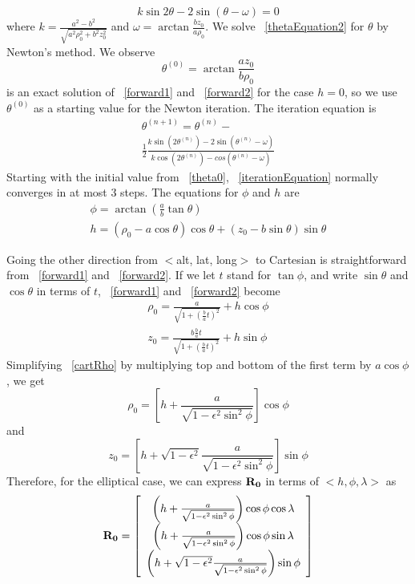 \documentclass[twoside,11pt,titlepage]{report}
\begin{document}
\begin{equation}
k\sin2\theta - 2\sin(\theta-\omega) = 0
\label{thetaEquation2}
\end{equation}
\noindent where $k = \frac{a^2-b^2}{\sqrt{a^2\rho_0^2+b^2z_0^2}}$ and $\omega = \arctan\frac{bz_0}{a\rho_0}$.
We solve ~\ref{thetaEquation2} for $\theta$ by Newton's method.  We observe \begin{equation}
\theta^{(0)} = \arctan\frac{az_0}{b\rho_0}
\label{theta0}
\end{equation}
\noindent is an exact solution of ~\ref{forward1} and ~\ref{forward2} for the case $h = 0$, so we use $\theta^{(0)}$ as a starting value for the Newton iteration.  The iteration equation is
\begin{eqnarray}
\theta^{(n+1)} = \theta^{(n)} - \nonumber \\
\frac{1}{2}\frac{k\sin(2\theta^{(n)}) - 2\sin(\theta^{(n)}-\omega)}
{k\cos(2\theta^{(n)}) - cos(\theta^{(n)}-\omega)}
\label{iterationEquation}
\end{eqnarray}
Starting with the initial value from ~\ref{theta0}, ~\ref{iterationEquation} normally converges in at most $3$ steps.  The equations for $\phi$ and $h$ are
\begin{eqnarray}
\phi = \arctan(\frac{a}{b}\tan\theta) \label{phiEquation} \\
h = (\rho_0-a\cos\theta)\cos\theta + (z_0-b\sin\theta)\sin\theta
\label{hEquation}
\end{eqnarray}

Going the other direction from $<$alt, lat, long$>$ to Cartesian is straightforward from ~\ref{forward1} and ~\ref{forward2}.  If we let $t$ stand for $\tan\phi$, and write $\sin\theta$ and $\cos\theta$ in terms of $t$, ~\ref{forward1} and ~\ref{forward2} become
\begin{eqnarray}
\rho_0 = \frac{a}{\sqrt{1+(\frac{b}{a}t)^2}} + h\cos\phi
\label{cartRho} \\
z_0 = \frac{b\frac{b}{a}t}{\sqrt{1+(\frac{b}{a}t)^2}} + h\sin\phi
\label{cartZ}
\end{eqnarray}
Simplifying ~\ref{cartRho} by multiplying top and bottom of the first term by $a\cos\phi$, we get
\begin{equation}
\rho_0 = \left[h + \frac{a}{\sqrt{1-\epsilon^2\sin^2\phi}}\right]\cos\phi
\label{cartRho1}
\end{equation}
and
\begin{equation}
z_0 = \left[h + \sqrt{1-\epsilon^2}\frac{a}{\sqrt{1-\epsilon^2\sin^2\phi}}\right]\sin\phi
\label{cartZ1}
\end{equation}
Therefore, for the elliptical case, we can express $\bf{R_0}$ in terms of $<h, \phi, \lambda>$ as
\begin{equation}
\bf{R_0} = \left[\begin{array}{c}
\left(h + \frac{a}{\sqrt{1-\epsilon^2\sin^2\phi}}\right)\cos\phi\cos\lambda \\
\left(h + \frac{a}{\sqrt{1-\epsilon^2\sin^2\phi}}\right)\cos\phi\sin\lambda \\
\left(h + \sqrt{1-\epsilon^2}\frac{a}{\sqrt{1-\epsilon^2\sin^2\phi}}\right)\sin\phi
\end{array}\right]
\label{ellipToCartesian}
\end{equation}
\end{document}
